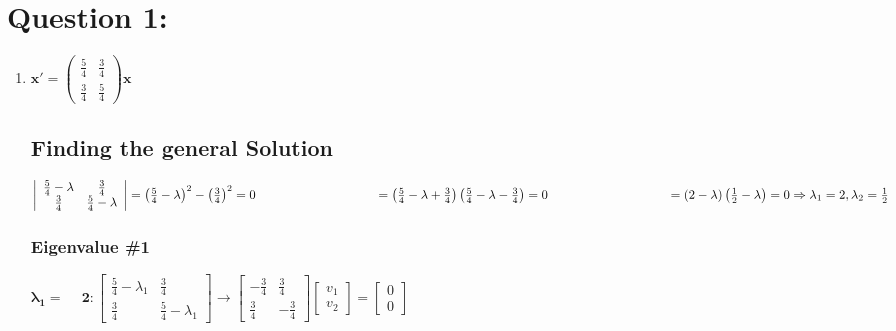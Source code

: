\documentclass[12pt]{article}
\begin{document}
\large
\begin{center}
\end{center}

\section*{Question 1:}
\renewcommand{\arraystretch}{1.3}
\begin{enumerate}
\item[a)] $\mathbf{x'} = \begin{pmatrix} \frac{5}{4} & \frac{3}{4} \\ \frac{3}{4} & \frac{5}{4} \end{pmatrix} \mathbf{x}$
\subsection*{Finding the general Solution}    
    $\left| \begin{array}{cc} \frac{5}{4} - \lambda & \frac{3}{4}\\ \frac{3}{4} & \frac{5}{4} - \lambda\end{array}\right| 
    = \left(\frac{5}{4} - \lambda\right)^2 - \left(\frac{3}{4}\right)^2 = 0 \\\\
    \hspace*{95pt} = \left(\frac{5}{4} - \lambda + \frac{3}{4}\right)\left(\frac{5}{4} - \lambda - \frac{3}{4}\right) = 0 \\\\
    \hspace*{95pt} = \left(2 - \lambda\right)\left(\frac{1}{2} - \lambda\right) = 0 \Rightarrow \lambda_1 = 2, \lambda_2 = \frac{1}{2}$
    
    \subsubsection*{Eigenvalue \#1}
    $\mathbf{\lambda_1 = \phantom{-}2}: 
    \left[\begin{array}{cc} \frac{5}{4} - \lambda_1 & \frac{3}{4}\\ \frac{3}{4} & \frac{5}{4} - \lambda_1\end{array}\right]
    \rightarrow \left[\begin{array}{rr} -\frac{3}{4}& \frac{3}{4}\\ \frac{3}{4} & -\frac{3}{4} \end{array}\right] \left[\begin{array}{cc} v_1 \\ v_2 \end{array}\right] = \left[\begin{array}{cc} 0 \\ 0 \end{array}\right]$


\end{enumerate}
\end{document}
